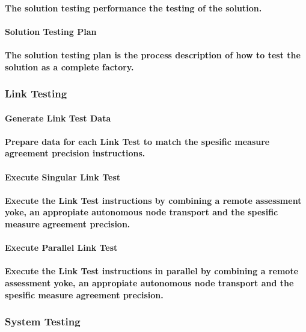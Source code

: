 \documentclass{acm_proc_article-sp}
\begin{document}
\paragraph{The solution testing performance the testing of the solution.}
\paragraph{Solution Testing Plan}
\paragraph{The solution testing plan is the process description of how to test the solution as a complete factory.}
\subsubsection{Link Testing}
\paragraph{Generate Link Test Data}
\paragraph{Prepare data for each Link Test to match the spesific measure agreement precision instructions.}
\paragraph{Execute Singular Link Test}
\paragraph{Execute the Link Test instructions by combining a remote assessment yoke, an appropiate autonomous node transport and the spesific measure agreement precision.}
\paragraph{Execute Parallel Link Test}
\paragraph{Execute the Link Test instructions in parallel by combining a remote assessment yoke, an appropiate autonomous node transport and the spesific measure agreement precision.}
\subsubsection{System Testing}
\end{document}
